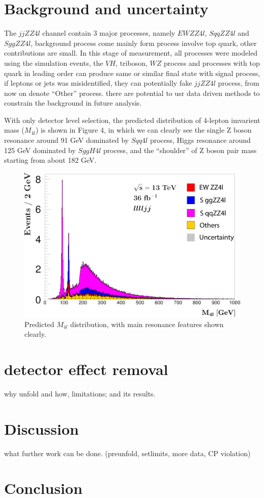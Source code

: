 \documentclass[12pt]{article}
\begin{document}
    \section{Background and uncertainty}
        \par The $jjZZ4l$ channel contain 3 major processes, namely $EW ZZ4l$, $S qqZZ4l$ and $S ggZZ4l$,
        background process come mainly form process involve top quark, other contributions are small.
        In this stage of measurement, all processes were modeled using the simulation events, the $VH$, triboson,
        $WZ$ process and processes with top quark in leading order can produce same or similar final state
        with signal process, if leptons or jets was misidentified, they can potentially fake $jjZZ4l$ process, from now on 
        denote ``Other'' process. 
        there are potential to usr data driven methods to constrain the background in future analysis.
        \par With only detector level selection, the predicted distribution of 4-lepton imvarient mass ($M_{4l}$) is shown in Figure 4, 
        in which we can clearly see the single Z boson resonance around 91 GeV dominated by $S qq4l$ process, 
        Higgs resonance around 125 GeV dominated by $S ggH4l$ process, and the ``shoulder'' of Z boson pair mass starting from about 182 GeV.

        \begin{figure}[ht]
            \begin{centering}
            \includegraphics[scale=0.15]{ps/det_llll_m_stack.png}
            \caption{Predicted $M_{4l}$ distribution, with main resonance features shown clearly.}
            \end{centering}
        \end{figure}
        \par 
        

    \section{detector effect removal}
        why unfold and how, limitations; and its results. 
    \section{Discussion}
        what further work can be done. (preunfold, setlimits, more data, CP violation) 
    \section{Conclusion}

    
    
    
\end{document}

